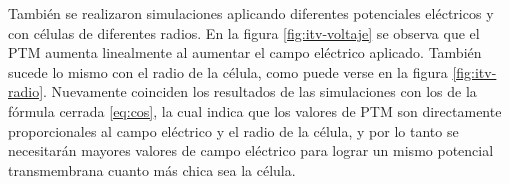 \clearpage

También se realizaron simulaciones aplicando diferentes potenciales eléctricos y con células de diferentes radios. En la figura \ref{fig:itv-voltaje} se observa que el PTM aumenta linealmente al aumentar el campo eléctrico aplicado. También sucede lo mismo con el radio de la célula, como puede verse en la figura \ref{fig:itv-radio}. Nuevamente coinciden los resultados de las simulaciones con los de la fórmula cerrada \ref{eq:cos}, la cual indica que los valores de PTM son directamente proporcionales al campo eléctrico y el radio de la célula, y por lo tanto se necesitarán mayores valores de campo eléctrico para lograr un mismo potencial transmembrana cuanto más chica sea la célula.

